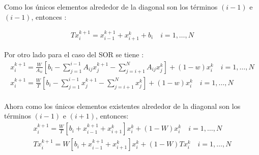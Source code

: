 Como los únicos elementos alrededor de la diagonal son los términos $(i-1)$ e $(i-1)$, entonces :

\begin{align*}
    Tx^{k+1}_{i} = x^{k+1}_{i-1} + x^{k}_{i+1} + b_{i} \quad i = 1,\dots, N
\end{align*}

Por otro lado para el caso del SOR se tiene :
\begin{align*}
    x^{k+1}_{i} = \frac{W}{A_{ii}} \left[b_i - \sum^{i-1}_{j = 1}A_{ij}x^{k+1}_j - \sum^{N}_{j = i+1}A_{ij}x^k_j \right] + (1 -w)x^k_i \quad i = 1,\dots, N\\
    x^{k+1}_{i} = \frac{W}{T} \left[b_i - \sum^{i-1}_{j = 1}x^{k+1}_j - \sum^{N}_{j = i+1}x^k_j \right] + (1 -w)x^k_i \quad i = 1,\dots, N\\
\end{align*}

Ahora como los únicos elementos existentes alrededor de la diagonal son los términos $(i-1)$  e $(i +1)$, entonces:
\begin{align*}
    x^{k+1}_i = \frac{W}{T}\left[b_i + x^{k+1}_{i-1} + x^k_{i+1}
    \right]x^k_i + (1 - W)x^k_i\quad i = 1,\dots, N\\
    Tx^{k+1}_i = W\left[b_i + x^{k+1}_{i-1} + x^k_{i+1} \right]x^k_i + (1 - W)Tx^k_i \quad i = 1,\dots, N\\
\end{align*}